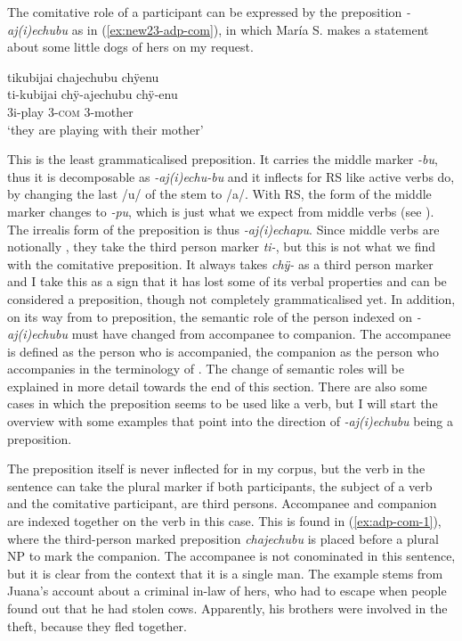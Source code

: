 The comitative role of a participant can be expressed by the preposition \textit{-aj(i)echu\-bu} as in (\ref{ex:new23-adp-com}), in which María S. makes a statement about some little dogs of hers on my request.

\ea\label{ex:new23-adp-com}
\begingl
\glpreamble tikubijai chajechubu chÿenu\\
\gla ti-kubijai chÿ-ajechubu chÿ-enu\\
\glb 3i-play 3-\textsc{com} 3-mother\\
\glft ‘they are playing with their mother’
\endgl
\trailingcitation{[rxx-e181101l-1]}
\xe

This is the least grammaticalised preposition. It carries the middle marker \textit{-bu}, thus it is decomposable as \textit{-aj(i)echu-bu} and it inflects for RS like active verbs do, by changing the last /u/ of the stem to /a/. With  RS, the form of the middle marker changes to \textit{-pu}, which is just what we expect from middle verbs (see ). The irrealis form of the preposition is thus \textit{-aj(i)echapu}. Since middle verbs are notionally , they take the third person marker \textit{ti-}, but this is not what we find with the comitative preposition. It always takes \textit{chÿ-} as a third person marker and I take this as a sign that it has lost some of its verbal properties and can be considered a preposition, though not completely grammaticalised yet. In addition, on its way from  to preposition, the semantic role of the person indexed on \textit{-aj(i)echubu} must have changed from accompanee to companion. The accompanee is defined as the person who is accompanied, the companion as the person who accompanies in the terminology of \citet[]{Stolz2006}.
The change of semantic roles will be explained in more detail towards the end of this section. There are also some cases in which the preposition seems to be used like a verb, but I will start the overview with some examples that point into the direction of \textit{-aj(i)echubu} being a preposition.

The preposition itself is never inflected for  in my corpus, but the verb in the sentence can take the plural marker if both participants, the subject of a verb and the comitative participant, are third persons. Accompanee and companion are indexed together on the verb in this case. This is found in (\ref{ex:adp-com-1}), where the third-person marked preposition \textit{chajechubu} is placed before a plural NP to mark the companion. The accompanee is not conominated in this sentence, but it is clear from the context that it is a single man. The example stems from Juana’s account about a criminal in-law of hers, who had to escape when people found out that he had stolen cows. Apparently, his brothers were involved in the theft, because they fled together.

